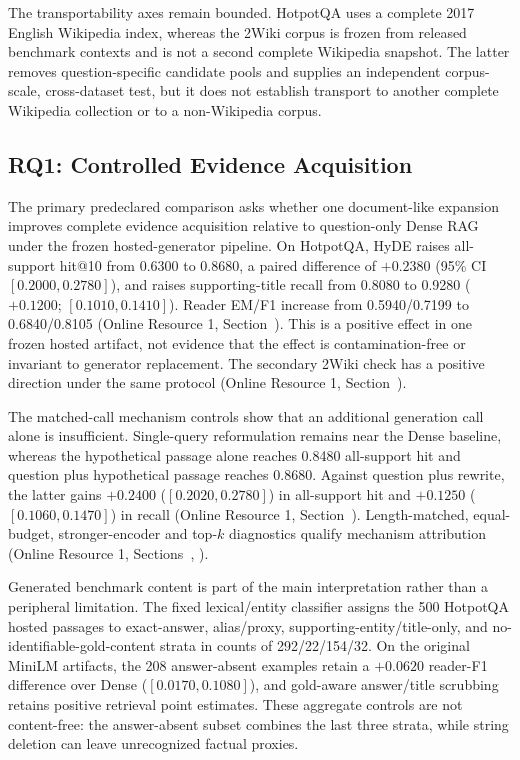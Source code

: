 The transportability axes remain bounded. HotpotQA uses a complete 2017 English Wikipedia index, whereas the 2Wiki corpus is frozen from released benchmark contexts and is not a second complete Wikipedia snapshot. The latter removes question-specific candidate pools and supplies an independent corpus-scale, cross-dataset test, but it does not establish transport to another complete Wikipedia collection or to a non-Wikipedia corpus.

\subsection{RQ1: Controlled Evidence Acquisition}
\label{sec:rq1_controlled_evidence}

The primary predeclared comparison asks whether one document-like expansion improves complete evidence acquisition relative to question-only Dense RAG under the frozen hosted-generator pipeline. On HotpotQA, HyDE raises all-support hit@10 from 0.6300 to 0.8680, a paired difference of $+0.2380$ (95\% CI $[0.2000,0.2780]$), and raises supporting-title recall from 0.8080 to 0.9280 ($+0.1200$; $[0.1010,0.1410]$). Reader EM/F1 increase from 0.5940/0.7199 to 0.6840/0.8105 (Online Resource 1, Section~). This is a positive effect in one frozen hosted artifact, not evidence that the effect is contamination-free or invariant to generator replacement. The secondary 2Wiki check has a positive direction under the same protocol (Online Resource 1, Section~).

The matched-call mechanism controls show that an additional generation call alone is insufficient. Single-query reformulation remains near the Dense baseline, whereas the hypothetical passage alone reaches 0.8480 all-support hit and question plus hypothetical passage reaches 0.8680. Against question plus rewrite, the latter gains $+0.2400$ ($[0.2020,0.2780]$) in all-support hit and $+0.1250$ ($[0.1060,0.1470]$) in recall (Online Resource 1, Section~). Length-matched, equal-budget, stronger-encoder and top-$k$ diagnostics qualify mechanism attribution (Online Resource 1, Sections~, ).

Generated benchmark content is part of the main interpretation rather than a peripheral limitation. The fixed lexical/entity classifier assigns the 500 HotpotQA hosted passages to exact-answer, alias/proxy, supporting-entity/title-only, and no-identifiable-gold-content strata in counts of 292/22/154/32. On the original MiniLM artifacts, the 208 answer-absent examples retain a $+0.0620$ reader-F1 difference over Dense ($[0.0170,0.1080]$), and gold-aware answer/title scrubbing retains positive retrieval point estimates. These aggregate controls are not content-free: the answer-absent subset combines the last three strata, while string deletion can leave unrecognized factual proxies.

